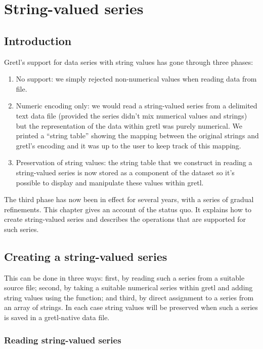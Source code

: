 \chapter{String-valued series}
\label{chap:strval-series}

\section{Introduction}

Gretl's support for data series with string values has gone through
three phases:
\begin{enumerate}
\item No support: we simply rejected non-numerical values when reading
  data from file.
\item Numeric encoding only: we would read a string-valued series from
  a delimited text data file (provided the series didn't mix numerical
  values and strings) but the representation of the data within gretl
  was purely numerical. We printed a ``string table'' showing the
  mapping between the original strings and gretl's encoding and it was
  up to the user to keep track of this mapping.
\item Preservation of string values: the string table that we
  construct in reading a string-valued series is now stored as a
  component of the dataset so it's possible to display and manipulate
  these values within gretl.
\end{enumerate}

The third phase has now been in effect for several years, with a
series of gradual refinements. This chapter gives an account of the
status quo. It explains how to create string-valued series and
describes the operations that are supported for such series.

\section{Creating a string-valued series}

This can be done in three ways: first, by reading such a series from a
suitable source file; second, by taking a suitable numerical series
within gretl and adding string values using the 
function; and third, by direct assignment to a series from an array of
strings.  In each case string values will be preserved when such a
series is saved in a gretl-native data file.

\subsection{Reading string-valued series}
\label{sec:reading}


